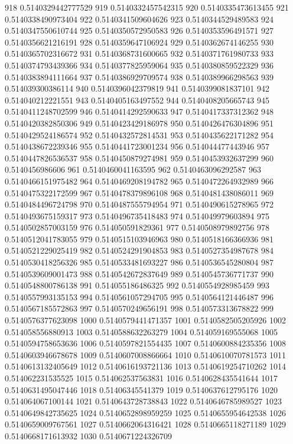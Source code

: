 918 0.5140329442777529
919 0.5140332457542315
920 0.5140335473613455
921 0.5140338490973404
922 0.5140341509604626
923 0.5140344529489583
924 0.5140347550610744
925 0.5140350572950583
926 0.5140353596491571
927 0.5140356621216191
928 0.5140359647106924
929 0.5140362674146255
930 0.5140365702316672
931 0.5140368731600665
932 0.5140371761980733
933 0.5140374793439366
934 0.5140377825959064
935 0.5140380859522329
936 0.5140383894111664
937 0.5140386929709574
938 0.5140389966298563
939 0.514039300386114
940 0.5140396042379819
941 0.5140399081837101
942 0.514040212221551
943 0.5140405163497552
944 0.5140408205665743
945 0.5140411248702599
946 0.5140414292590633
947 0.5140417337312362
948 0.5140420382850306
949 0.5140423429186978
950 0.5140426476304896
951 0.5140429524186574
952 0.5140432572814531
953 0.5140435622171282
954 0.5140438672239346
955 0.5140441723001234
956 0.514044477443946
957 0.5140447826536537
958 0.5140450879274981
959 0.5140453932637299
960 0.5140456986606
961 0.5140460041163595
962 0.5140463096292587
963 0.5140466151975482
964 0.5140469208194782
965 0.5140472264932989
966 0.5140475322172599
967 0.5140478379896108
968 0.5140481438086011
969 0.5140484496724798
970 0.5140487555794954
971 0.5140490615278965
972 0.5140493675159317
973 0.5140496735418483
974 0.514049979603894
975 0.5140502857003159
976 0.514050591829361
977 0.5140508979892756
978 0.5140512041783055
979 0.5140515103946963
980 0.5140518166366936
981 0.5140521229025419
982 0.5140524291904853
983 0.5140527354987678
984 0.5140530418256326
985 0.5140533481693227
986 0.5140536545280804
987 0.5140539609001473
988 0.5140542672837649
989 0.5140545736771737
990 0.5140548800786138
991 0.514055186486325
992 0.5140554928985459
993 0.5140557993135153
994 0.5140561057294705
995 0.5140564121446487
996 0.5140567185572863
997 0.5140570249656191
998 0.5140573313678822
999 0.5140576377623098
1000 0.5140579441471357
1001 0.5140582505205926
1002 0.514058556880913
1003 0.5140588632263279
1004 0.514059169555068
1005 0.5140594758653636
1006 0.5140597821554435
1007 0.5140600884235356
1008 0.5140603946678678
1009 0.5140607008866664
1010 0.5140610070781573
1011 0.5140613132405649
1012 0.5140616193721136
1013 0.5140619254710262
1014 0.514062231535525
1015 0.514062537563831
1016 0.5140628435541644
1017 0.5140631495047446
1018 0.51406345541379
1019 0.5140637612795176
1020 0.514064067100144
1021 0.5140643728738843
1022 0.5140646785989527
1023 0.5140649842735625
1024 0.5140652898959259
1025 0.5140655954642538
1026 0.5140659009767561
1027 0.5140662064316421
1028 0.5140665118271189
1029 0.5140668171613932
1030 0.5140671224326709
